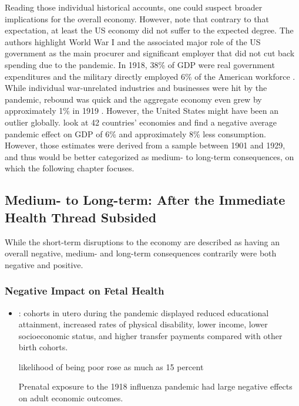 \documentclass[12pt,a4paper]{article}
\begin{document}
Reading those individual historical accounts, one could suspect broader implications for the overall economy.
However, \cite{benmelech1918InfluenzaDid2020} note that contrary to that expectation,
at least the US economy did not suffer to the expected degree.
The authors highlight World War I and the associated major role of the US government as the main procurer and significant employer that did not cut back spending due to the pandemic.
In 1918, 38\% of GDP were real government expenditures and the military directly employed 6\% of the American workforce \citep{benmelech1918InfluenzaDid2020}.
While individual war-unrelated industries and businesses were hit by the pandemic, rebound was quick and the aggregate economy even grew by approximately 1\% in 1919 \citep{romerWorldWarPostwar1988}.
However, the United States might have been an outlier globally.
\cite{barroCoronavirusGreatInfluenza2020} look at 42 countries' economies and find a negative average pandemic effect on GDP of 6\% and approximately 8\% less consumption.
However, those estimates were derived from a sample between 1901 and 1929, and thus would be better categorized as medium- to long-term consequences, on which the following chapter focuses.



\subsection{Medium- to Long-term: After the Immediate Health Thread Subsided} \label{sec:medlong}

While the short-term disruptions to the economy are described as having an overall negative, medium- and long-term consequences contrarily were both negative and positive.

\subsubsection{Negative Impact on Fetal Health}
\begin{itemize}
	\item \cite{almond1918InfluenzaPandemic2006}: cohorts in utero during
	the pandemic displayed reduced educational attainment, increased
	rates of physical disability, lower income, lower socioeconomic status,
	and higher transfer payments compared with other birth cohorts.
	
	likelihood of being poor rose as much as 15 percent
	
	Prenatal exposure to the 1918 influenza pandemic had large negative
	effects on adult economic outcomes. 
\end{itemize}
\end{document}
